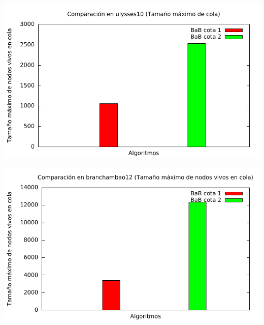\includegraphics[width=15cm]{img/barras_ulysses10_cola}

\includegraphics[width=15cm]{img/barras_branchambao12_cola}
